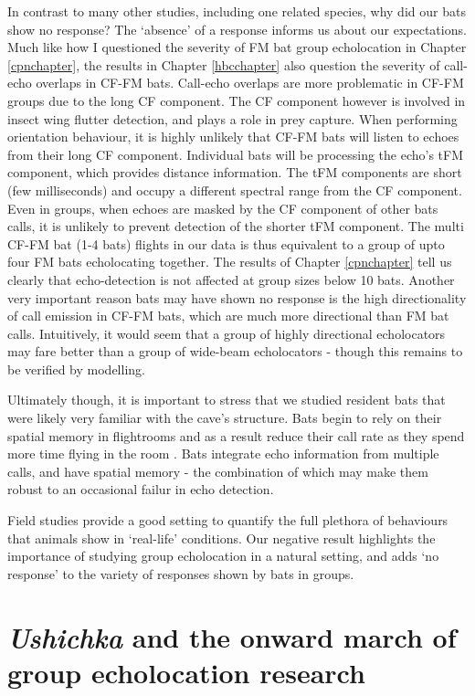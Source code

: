 \documentclass[
]{book}
\begin{document}
In contrast to many other studies, including one related species, why did our bats show no response? The `absence' of a response informs us about our expectations. Much like how I questioned the severity of FM bat group echolocation in Chapter \ref{cpnchapter}, the results in Chapter \ref{hbcchapter} also question the severity of call-echo overlaps in CF-FM bats. Call-echo overlaps are more problematic in CF-FM groups due to the long CF component. The CF component however is involved in insect wing flutter detection, and plays a role in prey capture. When performing orientation behaviour, it is highly unlikely that CF-FM bats will listen to echoes from their long CF component. Individual bats will be processing the echo's tFM component, which provides distance information. The tFM components are short (few milliseconds) and occupy a different spectral range from the CF component. Even in groups, when echoes are masked by the CF component of other bats calls, it is unlikely to prevent detection of the shorter tFM component. The multi CF-FM bat (1-4 bats) flights in our data is thus equivalent to a group of upto four FM bats echolocating together. The results of Chapter \ref{cpnchapter} tell us clearly that echo-detection is not affected at group sizes below 10 bats. Another very important reason bats may have shown no response is the high directionality of call emission in CF-FM bats, which are much more directional than FM bat calls. Intuitively, it would seem that a group of highly directional echolocators may fare better than a group of wide-beam echolocators - though this remains to be verified by modelling.

Ultimately though, it is important to stress that we studied resident bats that were likely very familiar with the cave's structure. Bats begin to rely on their spatial memory in flightrooms and as a result reduce their call rate as they spend more time flying in the room \citep{chen2015variation, yamada2020modulation, barchi2013spatial}. Bats integrate echo information from multiple calls, and have spatial memory - the combination of which may make them robust to an occasional failur in echo detection.

Field studies provide a good setting to quantify the full plethora of behaviours that animals show in `real-life' conditions. Our negative result highlights the importance of studying group echolocation in a natural setting, and adds `no response' to the variety of responses shown by bats in groups.

\hypertarget{ushichka-and-the-onward-march-of-group-echolocation-research}{%
\section{\texorpdfstring{\emph{Ushichka} and the onward march of group echolocation research}{Ushichka and the onward march of group echolocation research}}\label{ushichka-and-the-onward-march-of-group-echolocation-research}}
\end{document}
